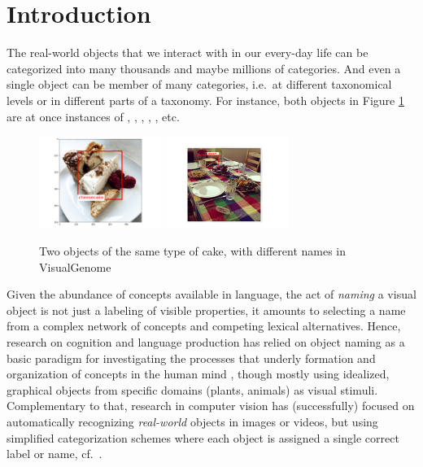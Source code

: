 \section{Introduction}

The real-world objects that we interact with in our every-day life can be categorized into many thousands and maybe millions of categories. And even a single object can be member of many categories, i.e.\ at different taxonomical levels or in different parts of a taxonomy. For instance, both objects in Figure \ref{fig:cake} are at once instances of , , , , ,  etc.

\begin{figure}[htbp]
\begin{center}
\includegraphics[height=3cm]{Figures/cheescake.png}
\includegraphics[height=3cm]{Figures/cheesecak2.pdf}
\caption{Two objects of the same type of cake, with different names in VisualGenome}
\label{fig:cake}
\end{center}
\end{figure}


Given the abundance of concepts available in language, the act of \textit{naming} a visual object is not just a labeling of visible properties, it amounts to selecting a name from a complex network of concepts and competing lexical alternatives.
Hence, research on cognition and language production has relied on object naming as a basic paradigm for investigating the processes that underly formation and organization of concepts in the human mind  \cite{rosch1976basic} , though mostly using idealized, graphical objects from specific domains (plants, animals) as visual stimuli.
Complementary to that, research in computer vision has (successfully) focused on automatically recognizing \textit{real-world} objects in images or videos, but using simplified categorization schemes where each object is assigned a single correct label or name, cf.\ \cite{googlenet}. %

